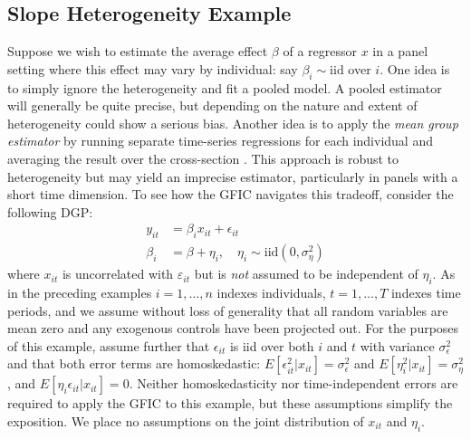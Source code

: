 \subsection{Slope Heterogeneity Example}
\label{sec:slopeHet}
Suppose we wish to estimate the average effect $\beta$ of a regressor $x$ in a panel setting where this effect may vary by individual: say $\beta_i \sim \mbox{iid}$ over $i$.
One idea is to simply ignore the heterogeneity and fit a pooled model.
A pooled estimator will generally be quite precise, but depending on the nature and extent of heterogeneity could show a serious bias.
Another idea is to apply the \emph{mean group estimator} by running separate time-series regressions for each individual and averaging the result over the cross-section \citep{Swamy1970,PesaranSmith1995,PesaranEtAl1999}.
This approach is robust to heterogeneity but may yield an imprecise estimator, particularly in panels with a short time dimension.
To see how the GFIC navigates this tradeoff, consider the following DGP:
	\begin{align}
				y_{it} &= \beta_i x_{it} + \epsilon_{it}\\
        \beta_i &= \beta + \eta_i, \quad \eta_i \sim \mbox{iid} (0, \sigma_\eta^2)
	\end{align}
  where $x_{it}$ is uncorrelated with $\varepsilon_{it}$ but is \emph{not} assumed to be independent of $\eta_i$. 
As in the preceding examples $i = 1, \hdots, n$ indexes individuals, $t=1, \hdots, T$ indexes time periods, and we assume without loss of generality that all random variables are mean zero and any exogenous controls have been projected out.
For the purposes of this example, assume further that $\epsilon_{it}$ is iid over both $i$ and $t$ with variance $\sigma_\epsilon^2$ and that both error terms are homoskedastic: $E[\epsilon_{it}^2 | x_{it}] = \sigma_\epsilon^2$ and $E[\eta_i^2 | x_{it}] = \sigma_\eta^2$, and $E[\eta_i \epsilon_{it} | x_{it}] = 0$.
Neither homoskedasticity nor time-independent errors are required to apply the GFIC to this example, but these assumptions simplify the exposition.  
We place no assumptions on the joint distribution of $x_{it}$ and $\eta_i$.

